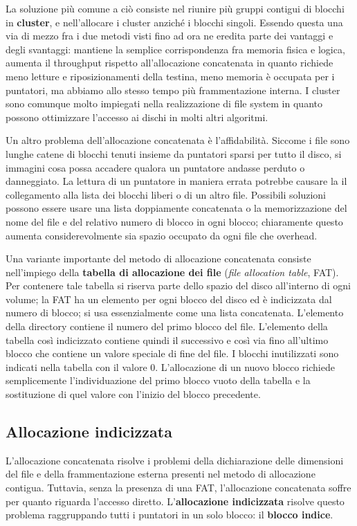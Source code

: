         La soluzione più comune a ciò consiste nel riunire più gruppi contigui di blocchi in \textbf{cluster}, e nell'allocare i cluster anziché i blocchi singoli. Essendo questa una via di mezzo fra i due metodi visti fino ad ora ne eredita parte dei vantaggi e degli svantaggi: mantiene la semplice corrispondenza fra memoria fisica e logica, aumenta il throughput rispetto all'allocazione concatenata in quanto richiede meno letture e riposizionamenti della testina, meno memoria è occupata per i puntatori, ma abbiamo allo stesso tempo più frammentazione interna. I cluster sono comunque molto impiegati nella realizzazione di file system in quanto possono ottimizzare l'accesso ai dischi in molti altri algoritmi.
        
        Un altro problema dell'allocazione concatenata è l'affidabilità. Siccome i file sono lunghe catene di blocchi tenuti insieme da puntatori sparsi per tutto il disco, si immagini cosa possa accadere qualora un puntatore andasse perduto o danneggiato. La lettura di un puntatore in maniera errata potrebbe causare la il collegamento alla lista dei blocchi liberi o di un altro file. Possibili soluzioni possono essere usare una lista doppiamente concatenata o la memorizzazione del nome del file e del relativo numero di blocco in ogni blocco; chiaramente questo aumenta considerevolmente sia spazio occupato da ogni file che overhead.
        
        Una variante importante del metodo di allocazione concatenata consiste nell'impiego della \textbf{tabella di allocazione dei file} (\textit{file allocation table}, FAT). Per contenere tale tabella si riserva parte dello spazio del disco all'interno di ogni volume; la FAT ha un elemento per ogni blocco del disco ed è indicizzata dal numero di blocco; si usa essenzialmente come una lista concatenata. L'elemento della directory contiene il numero del primo blocco del file. L'elemento della tabella così indicizzato contiene quindi il successivo e così via fino all'ultimo blocco che contiene un valore speciale di fine del file. I blocchi inutilizzati sono indicati nella tabella con il valore 0. L'allocazione di un nuovo blocco richiede semplicemente l'individuazione del primo blocco vuoto della tabella e la sostituzione di quel valore con l'inizio del blocco precedente.
        
    \subsection{Allocazione indicizzata}
        L'allocazione concatenata risolve i problemi della dichiarazione delle dimensioni del file e della frammentazione esterna presenti nel metodo di allocazione contigua. Tuttavia, senza la presenza di una FAT, l'allocazione concatenata soffre per quanto riguarda l'accesso diretto. L'\textbf{allocazione indicizzata} risolve questo problema raggruppando tutti i puntatori in un solo blocco: il \textbf{blocco indice}.
        
